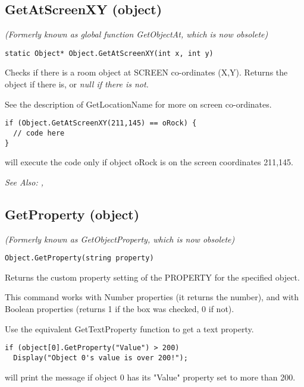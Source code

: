 \subsection{GetAtScreenXY (object)}\label{Object.GetAtScreenXY}%

\it{(Formerly known as global function GetObjectAt, which is now obsolete)}

\begin{verbatim}
static Object* Object.GetAtScreenXY(int x, int y)
\end{verbatim}
Checks if there is a room object at SCREEN co-ordinates (X,Y).
Returns the object if there is, or \it{null} if there is not.

See the description of GetLocationName for more on screen co-ordinates.

\begin{verbatim}
if (Object.GetAtScreenXY(211,145) == oRock) {
  // code here
}
\end{verbatim}
will execute the code only if object oRock is on the screen coordinates 211,145.

\it{See Also:} ,


\subsection{GetProperty (object)}\label{Object.GetProperty}%

\it{(Formerly known as GetObjectProperty, which is now obsolete)}

\begin{verbatim}
Object.GetProperty(string property)
\end{verbatim}
Returns the custom property setting of the PROPERTY for the specified object.

This command works with Number properties (it returns the number), and with Boolean
properties (returns 1 if the box was checked, 0 if not).

Use the equivalent GetTextProperty function to get a text property.

\begin{verbatim}
if (object[0].GetProperty("Value") > 200)
  Display("Object 0's value is over 200!");
\end{verbatim}
will print the message if object 0 has its "Value" property set to more than 200.

